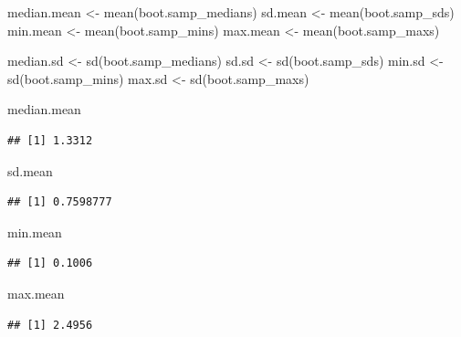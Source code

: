 \documentclass[
]{article}
\newenvironment{Shaded}{\begin{snugshade}}{\end{snugshade}}
\newcommand{\FunctionTok}[1]{\textcolor[rgb]{0.00,0.00,0.00}{#1}}
\newcommand{\NormalTok}[1]{#1}
\newcommand{\OtherTok}[1]{\textcolor[rgb]{0.56,0.35,0.01}{#1}}
\begin{document}
\begin{Shaded}
\begin{Highlighting}[]
\NormalTok{median.mean }\OtherTok{\textless{}{-}} \FunctionTok{mean}\NormalTok{(boot.samp\_medians)}
\NormalTok{sd.mean }\OtherTok{\textless{}{-}} \FunctionTok{mean}\NormalTok{(boot.samp\_sds)}
\NormalTok{min.mean }\OtherTok{\textless{}{-}} \FunctionTok{mean}\NormalTok{(boot.samp\_mins)}
\NormalTok{max.mean }\OtherTok{\textless{}{-}} \FunctionTok{mean}\NormalTok{(boot.samp\_maxs)}

\NormalTok{median.sd }\OtherTok{\textless{}{-}} \FunctionTok{sd}\NormalTok{(boot.samp\_medians)}
\NormalTok{sd.sd }\OtherTok{\textless{}{-}} \FunctionTok{sd}\NormalTok{(boot.samp\_sds)}
\NormalTok{min.sd }\OtherTok{\textless{}{-}} \FunctionTok{sd}\NormalTok{(boot.samp\_mins)}
\NormalTok{max.sd }\OtherTok{\textless{}{-}} \FunctionTok{sd}\NormalTok{(boot.samp\_maxs)}

\NormalTok{median.mean}
\end{Highlighting}
\end{Shaded}

\begin{verbatim}
## [1] 1.3312
\end{verbatim}

\begin{Shaded}
\begin{Highlighting}[]
\NormalTok{sd.mean}
\end{Highlighting}
\end{Shaded}

\begin{verbatim}
## [1] 0.7598777
\end{verbatim}

\begin{Shaded}
\begin{Highlighting}[]
\NormalTok{min.mean}
\end{Highlighting}
\end{Shaded}

\begin{verbatim}
## [1] 0.1006
\end{verbatim}

\begin{Shaded}
\begin{Highlighting}[]
\NormalTok{max.mean}
\end{Highlighting}
\end{Shaded}

\begin{verbatim}
## [1] 2.4956
\end{verbatim}
\end{document}
